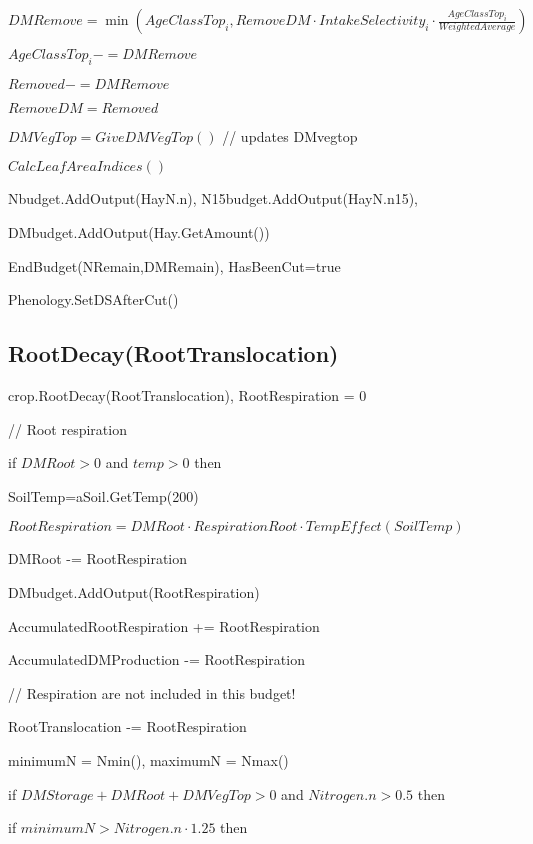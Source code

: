 \documentclass[%
]{scrartcl}
\begin{document}
  \quad  \quad       $DMRemove = \min\left(AgeClassTop_i,RemoveDM \cdot IntakeSelectivity_i 
  \cdot \tfrac{AgeClassTop_i}{WeightedAverage}\right)$

   \quad \quad 		$AgeClassTop_i -= DMRemove$

  \quad  \quad       $Removed -= DMRemove$
   	
   \quad    $RemoveDM = Removed$
  

   $DMVegTop=GiveDMVegTop() $      //  updates DMvegtop

   $CalcLeafAreaIndices()$

   Nbudget.AddOutput(HayN.n), N15budget.AddOutput(HayN.n15),

   DMbudget.AddOutput(Hay.GetAmount())
  
   EndBudget(NRemain,DMRemain),
   HasBeenCut=true

   Phenology.SetDSAfterCut()









\subsection{RootDecay(RootTranslocation)}

   crop.RootDecay(RootTranslocation),
   RootRespiration = 0

   //  Root respiration

   if $DMRoot>0$  and  $temp>0$ then
   
  \quad     SoilTemp=aSoil.GetTemp(200)

   \quad    $RootRespiration  = DMRoot \cdot RespirationRoot \cdot TempEffect(SoilTemp)$

   \quad    DMRoot -= RootRespiration

   \quad    DMbudget.AddOutput(RootRespiration)

   \quad    AccumulatedRootRespiration += RootRespiration

    \quad   AccumulatedDMProduction -= RootRespiration         

//  Respiration are not included in this budget!

   \quad    RootTranslocation -=  RootRespiration   
   
   minimumN = Nmin(), maximumN = Nmax()

   if $DMStorage + DMRoot + DMVegTop > 0$  and  $Nitrogen.n > 0.5$ then
  
 	if $minimumN > Nitrogen.n  \cdot  1.25$ then 
\end{document}
